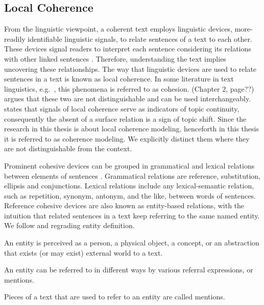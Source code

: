 \subsection{Local Coherence}

From the linguistic viewpoint, a coherent text employs linguistic devices, more-readily identifiable linguistic signals, to relate sentences of a text to each other. 
These devices signal readers to interpret each sentence considering its relations with other linked sentences \cite{vandijk77}. 
Therefore, understanding the text implies uncovering these relationships.  
The way that linguistic devices are used to relate sentences in a text is known as local coherence. 
In some literature in text linguistics, e.g.\ , this phenomena is referred to as cohesion.   
 (Chapter 2, page??) argues that these two are not distinguishable and can be used interchangeably. 
 states that signals of local coherence serve as indicators of topic continuity, consequently the absent of a surface relation is a sign of topic shift. 
Since the research in this thesis is about local coherence modeling, henceforth in this thesis it is referred to as coherence modeling. 
We explicitly distinct them where they are not distinguishable from the context. 

Prominent cohesive devices can be grouped in grammatical and lexical relations between elements of sentences \cite{halliday76}. 
Grammatical relations are reference, substitution, ellipsis and conjunctions. 
Lexical relations include any lexical-semantic relation, such as repetition, synonym, antonym, and the like, between words of sentences. 
Reference cohesive devices are also known as entity-based relations, with the intuition that related sentences in a text keep referring to the same named entity. 
We follow  and  regrading entity definition.  

\begin{definition}
    An entity is perceived as a person, a physical object, a concept, or an abstraction that exists (or may exist) external world to a text.  
\end{definition}

An entity can be referred to in different ways by various referral expressions, or mentions. 

\begin{definition}
	Pieces of a text that are used to refer to an entity are called mentions. 
\end{definition}

